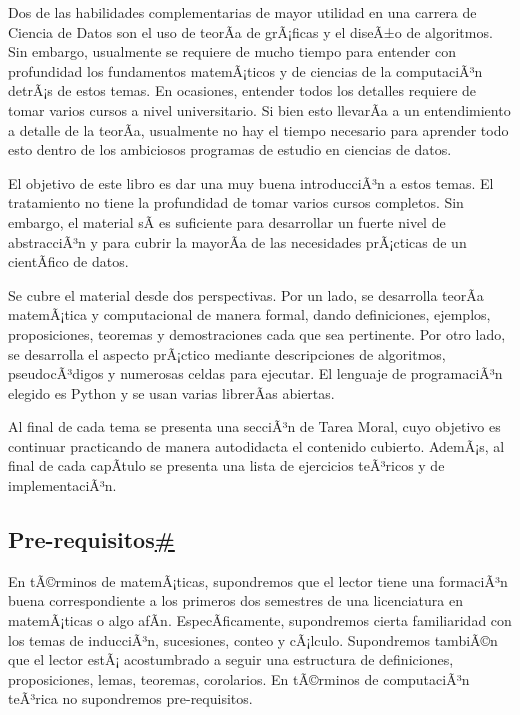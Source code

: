 \documentclass[
]{article}
\begin{document}
Dos de las habilidades complementarias de mayor utilidad en una carrera
de Ciencia de Datos son el uso de teorÃ­a de grÃ¡ficas y el diseÃ±o de
algoritmos. Sin embargo, usualmente se requiere de mucho tiempo para
entender con profundidad los fundamentos matemÃ¡ticos y de ciencias de
la computaciÃ³n detrÃ¡s de estos temas. En ocasiones, entender todos los
detalles requiere de tomar varios cursos a nivel universitario. Si bien
esto llevarÃ­a a un entendimiento a detalle de la teorÃ­a, usualmente no
hay el tiempo necesario para aprender todo esto dentro de los ambiciosos
programas de estudio en ciencias de datos.

El objetivo de este libro es dar una muy buena introducciÃ³n a estos
temas. El tratamiento no tiene la profundidad de tomar varios cursos
completos. Sin embargo, el material sÃ­ es suficiente para desarrollar un
fuerte nivel de abstracciÃ³n y para cubrir la mayorÃ­a de las necesidades
prÃ¡cticas de un cientÃ­fico de datos.

Se cubre el material desde dos perspectivas. Por un lado, se desarrolla
teorÃ­a matemÃ¡tica y computacional de manera formal, dando definiciones,
ejemplos, proposiciones, teoremas y demostraciones cada que sea
pertinente. Por otro lado, se desarrolla el aspecto prÃ¡ctico mediante
descripciones de algoritmos, pseudocÃ³digos y numerosas celdas para
ejecutar. El lenguaje de programaciÃ³n elegido es Python y se usan
varias librerÃ­as abiertas.

Al final de cada tema se presenta una secciÃ³n de Tarea Moral, cuyo
objetivo es continuar practicando de manera autodidacta el contenido
cubierto. AdemÃ¡s, al final de cada capÃ­tulo se presenta una lista de
ejercicios teÃ³ricos y de implementaciÃ³n.

\subsection{\texorpdfstring{Pre-requisitos\hyperref[pre-requisitos]{\#}}{Pre-requisitos\#}}\label{pre-requisitos}

En tÃ©rminos de matemÃ¡ticas, supondremos que el lector tiene una
formaciÃ³n buena correspondiente a los primeros dos semestres de una
licenciatura en matemÃ¡ticas o algo afÃ­n. EspecÃ­ficamente, supondremos
cierta familiaridad con los temas de inducciÃ³n, sucesiones, conteo y
cÃ¡lculo. Supondremos tambiÃ©n que el lector estÃ¡ acostumbrado a seguir
una estructura de definiciones, proposiciones, lemas, teoremas,
corolarios. En tÃ©rminos de computaciÃ³n teÃ³rica no supondremos
pre-requisitos.
\end{document}
